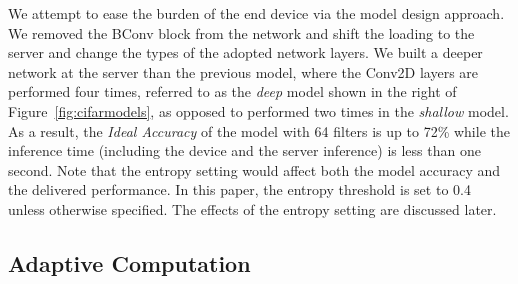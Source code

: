 \documentclass[conference]{IEEEtran}
\def\figurename{Figure}
\def\tablename{TABLE}
\begin{document}
%
We attempt to ease the burden of the end device via the model design approach. We removed the BConv block from the network and shift the loading to the server and change the types of the adopted network layers. We built a deeper network at the server than the previous model, where the Conv2D layers are performed four times, referred to as the \emph{deep} model shown in the right of \figurename~\ref{fig:cifarmodels}, as opposed to performed two times in the \emph{shallow} model. As a result, the \emph{Ideal Accuracy} of the model with 64 filters is up to 72\% while the inference time (including the device and the server inference) is less than one second. Note that the entropy setting would affect both the model accuracy and the delivered performance. In this paper, the entropy threshold is set to 0.4 unless otherwise specified. The effects of the entropy setting are discussed later.


\subsection{Adaptive Computation}
\end{document}
